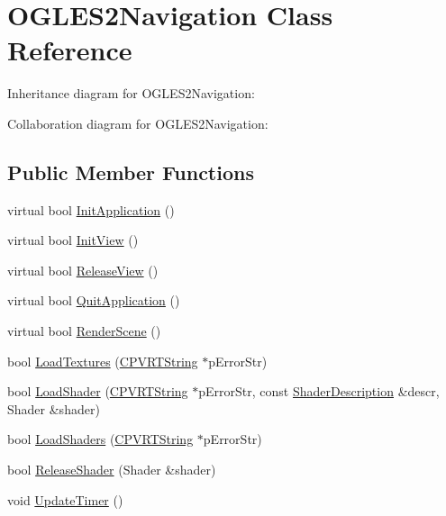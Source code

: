\hypertarget{class_o_g_l_e_s2_navigation}{\section{O\+G\+L\+E\+S2\+Navigation Class Reference}
\label{class_o_g_l_e_s2_navigation}
}


Inheritance diagram for O\+G\+L\+E\+S2\+Navigation\+:


Collaboration diagram for O\+G\+L\+E\+S2\+Navigation\+:
\subsection*{Public Member Functions}
\begin{DoxyCompactItemize}
\item 
virtual bool \hyperlink{class_o_g_l_e_s2_navigation_a22f3f0435c3f0f98c7cbcc275f91fef4}{Init\+Application} ()
\item 
virtual bool \hyperlink{class_o_g_l_e_s2_navigation_a014013f3e31c04b0500da5de60a6974d}{Init\+View} ()
\item 
virtual bool \hyperlink{class_o_g_l_e_s2_navigation_a93ff17e698aebf2b1f8167d31c7c0f2a}{Release\+View} ()
\item 
virtual bool \hyperlink{class_o_g_l_e_s2_navigation_a4642785ead18829a4e931ead54e34c91}{Quit\+Application} ()
\item 
virtual bool \hyperlink{class_o_g_l_e_s2_navigation_a9cb124d8ade34220559eca3f2130fdeb}{Render\+Scene} ()
\item 
bool \hyperlink{class_o_g_l_e_s2_navigation_ac37192e2b0d4e502726936f4fa737b0c}{Load\+Textures} (\hyperlink{class_c_p_v_r_t_string}{C\+P\+V\+R\+T\+String} $\ast$p\+Error\+Str)
\item 
bool \hyperlink{class_o_g_l_e_s2_navigation_a03526c9b7933c39000d0715e1fdd8b44}{Load\+Shader} (\hyperlink{class_c_p_v_r_t_string}{C\+P\+V\+R\+T\+String} $\ast$p\+Error\+Str, const \hyperlink{struct_shader_description}{Shader\+Description} \&descr, Shader \&shader)
\item 
bool \hyperlink{class_o_g_l_e_s2_navigation_a2e003ef423f1d04cbb4dbf3dae36f6c5}{Load\+Shaders} (\hyperlink{class_c_p_v_r_t_string}{C\+P\+V\+R\+T\+String} $\ast$p\+Error\+Str)
\item 
bool \hyperlink{class_o_g_l_e_s2_navigation_a61f084123b1b9893af90dc49b6b0f655}{Release\+Shader} (Shader \&shader)
\item 
void \hyperlink{class_o_g_l_e_s2_navigation_ad3e9d39acd93a212e7eaec9d40ab78df}{Update\+Timer} ()

\end{DoxyCompactItemize}

